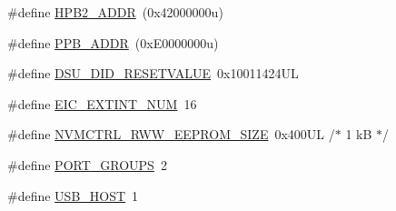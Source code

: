 \begin{DoxyCompactItemize}
\item 
\#define \mbox{\hyperlink{group___s_a_m_d21_g15_b__definitions_gaef42fa53ddf169a2a50be70d29f73571}{H\+P\+B2\+\_\+\+A\+D\+DR}}~(0x42000000u)
\item 
\#define \mbox{\hyperlink{group___s_a_m_d21_g15_b__definitions_ga8895d0a3a9a3126cc44330f86c8ce564}{P\+P\+B\+\_\+\+A\+D\+DR}}~(0x\+E0000000u)
\item 
\#define \mbox{\hyperlink{group___s_a_m_d21_g15_b__definitions_gada75131d542c9e1966238f5488f89bd6}{D\+S\+U\+\_\+\+D\+I\+D\+\_\+\+R\+E\+S\+E\+T\+V\+A\+L\+UE}}~0x10011424\+UL
\item 
\#define \mbox{\hyperlink{group___s_a_m_d21_g15_b__definitions_ga88ebc38c95506296f5d21f82476296ae}{E\+I\+C\+\_\+\+E\+X\+T\+I\+N\+T\+\_\+\+N\+UM}}~16
\item 
\#define \mbox{\hyperlink{group___s_a_m_d21_g15_b__definitions_gacb7a115808eeb0b50bd55888f9ba65ae}{N\+V\+M\+C\+T\+R\+L\+\_\+\+R\+W\+W\+\_\+\+E\+E\+P\+R\+O\+M\+\_\+\+S\+I\+ZE}}~0x400\+U\+L /$\ast$ 1 k\+B $\ast$/
\item 
\#define \mbox{\hyperlink{group___s_a_m_d21_g15_b__definitions_gab9243ffe03a1dc631b57a495b4b3d467}{P\+O\+R\+T\+\_\+\+G\+R\+O\+U\+PS}}~2
\item 
\#define \mbox{\hyperlink{group___s_a_m_d21_g15_b__definitions_ga856aa08fb33114928cbc8635be1792e4}{U\+S\+B\+\_\+\+H\+O\+ST}}~1
\end{DoxyCompactItemize}
